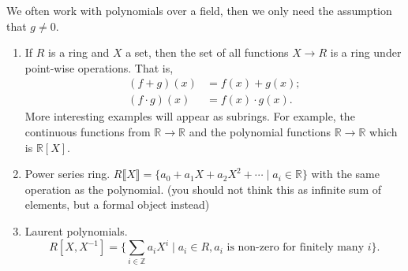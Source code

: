 \begin{remark}
    We often work with polynomials over a field, then we only need the assumption that \(g \neq 0\).
\end{remark}
\begin{example}
    \leavevmode
    \begin{enumerate}
        \item If \(R\) is a ring and \(X\) a set, then the set of all functions \(X \to R\) is a ring under point-wise operations. That is,
        \begin{align*}
            (f + g)(x) &= f(x) + g(x);\\
            (f \cdot g)(x) &= f(x) \cdot g(x).
        \end{align*}
        More interesting examples will appear as subrings. For example, the continuous functions from \(\mathbb{R}\to \mathbb{R}\) and the polynomial functions \(\mathbb{R} \to \mathbb{R}\) which is \(\mathbb{R}[X]\).
        \item Power series ring. \(R\llbracket X\rrbracket = \{a_0 + a_{1}X + a_2 X^2 + \cdots \mid a_i \in \mathbb{R}\}\) with the same operation as the polynomial. (you should not think this as infinite sum of elements, but a formal object instead)
        \item Laurent polynomials.
        \[R[X, X^{-1}]=\{\sum\limits_{i\in \mathbb{Z}} a_i X^i\mid a_i \in R, a_i \text{ is non-zero for finitely many \(i\)}\}.\]
    \end{enumerate}
\end{example}